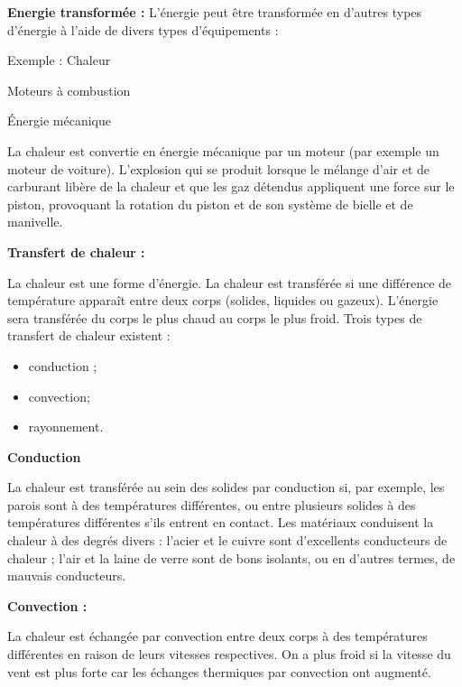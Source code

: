 \vspace{0.3cm}
\textbf{Energie transformée : } L'énergie peut être transformée en d'autres types d'énergie à l'aide de divers types d'équipements :
\vspace{0.3cm}


Exemple :
Chaleur


Moteurs à combustion


   Énergie mécanique



   
\vspace{0.3cm}
La chaleur est convertie en énergie mécanique par un moteur (par exemple un moteur de voiture). L'explosion qui se produit lorsque le mélange d'air et de carburant libère de la chaleur et que les gaz détendus appliquent une force sur le piston, provoquant la rotation du piston et de son système de bielle et de manivelle.
\vspace{0.3cm}

\textbf{Transfert de chaleur :} 
\vspace{0.3cm}

La chaleur est une forme d'énergie. La chaleur est transférée si une différence de température apparaît entre deux corps (solides, liquides ou gazeux). L'énergie sera transférée du corps le plus chaud au corps le plus froid.
Trois types de transfert de chaleur existent :
\begin{itemize}
    \item conduction ;
    \item convection;
    \item rayonnement.
\end{itemize}

\vspace{0.3cm}
\textbf{Conduction} 
\vspace{0.3cm}

La chaleur est transférée au sein des solides par conduction si, par exemple, les parois sont à des températures différentes, ou entre plusieurs solides à des températures différentes s'ils entrent en contact.
Les matériaux conduisent la chaleur à des degrés divers : l'acier et le cuivre sont d'excellents conducteurs de chaleur ; l'air et la laine de verre sont de bons isolants, ou en d'autres termes, de mauvais conducteurs.

\vspace{0.3cm}
\textbf{Convection : }
\vspace{0.3cm}

La chaleur est échangée par convection entre deux corps à des températures différentes en raison de leurs vitesses respectives.
On a plus froid si la vitesse du vent est plus forte car les échanges thermiques par convection ont augmenté.

